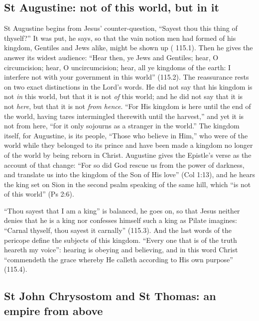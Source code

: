 \subsection{St Augustine: not of this world, but in it}
\label{sec:hence-augustine}

St Augustine begins from Jesus' counter-question, ``Sayest thou this thing of
thyself?'' It was put, he says, so that the vain notion men had formed of his
kingdom, Gentiles and Jews alike, might be shown up ( 115.1). Then he gives the answer its widest audience: ``Hear
then, ye Jews and Gentiles; hear, O circumcision; hear, O uncircumcision; hear,
all ye kingdoms of the earth: I interfere not with your government in this
world'' (115.2). The reassurance rests on two exact distinctions in the
Lord's words. He did not say that his kingdom is not \emph{in} this world, but
that it is not \emph{of} this world; and he did not say that it is not
\emph{here}, but that it is not \emph{from hence}. ``For His kingdom is here
until the end of the world, having tares intermingled therewith until the
harvest,'' and yet it is not from here, ``for it only sojourns as a stranger in
the world.'' The kingdom itself, for Augustine, is its people, ``Those who
believe in Him,'' who were of the world while they belonged to its prince and
have been made a kingdom no longer of the world by being reborn in Christ. Augustine gives the Epistle's verse as
the account of that change: ``For so did God rescue us from the power of
darkness, and translate us into the kingdom of the Son of His love'' (Col
1:13), and he hears the king set on Sion in the second psalm speaking of the
same hill, which ``is not of this world'' (Ps 2:6).

``Thou sayest that I am a king'' is balanced, he goes on, so that Jesus neither
denies that he is a king nor confesses himself such a king as Pilate imagines:
``Carnal thyself, thou sayest it carnally'' (115.3). And the last words of the
pericope define the subjects of this kingdom. ``Every one that is of the
truth heareth my voice'': hearing is obeying and believing, and in this word
Christ ``commendeth the grace whereby He calleth according to His own
purpose'' (115.4).

\subsection{St John Chrysostom and St Thomas: an empire from above}
\label{sec:hence-chrysostom}

